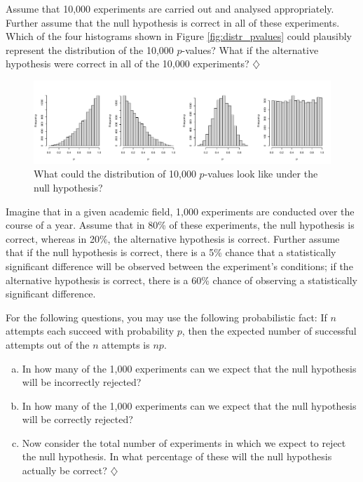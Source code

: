 \documentclass[a4paper]{tufte-book}\usepackage[]{graphicx}\usepackage[]{xcolor}
\newcommand*{\parend}[1][$\diamondsuit$]{%
\leavevmode\unskip\penalty9999 \hbox{}\nobreak\hfill
    \quad\hbox{#1}%
}
\begin{document}
Assume that 10,000 experiments are carried out and analysed appropriately.
Further assume that the null hypothesis is correct in all of these experiments.
Which of the four histograms shown in Figure \vref{fig:distr_pvalues}
could plausibly represent the distribution of the 10,000 $p$-values?
What if the alternative hypothesis were correct in all of the 10,000 experiments?
\parend

\begin{figure}[htp]
    \centering
    \includegraphics[width=\textwidth]{figure/distr_pvalues}
    \caption{What could the distribution of 10,000 $p$-values look like under the null hypothesis?}
    \label{fig:distr_pvalues}
\end{figure}

  Imagine that in a given academic field, 
  1,000 experiments are conducted over the course of a year.
  Assume that in 80\% of these experiments, the null hypothesis is correct,
  whereas in 20\%, the alternative hypothesis is correct.
  Further assume that if the null hypothesis is correct, 
  there is a 5\% chance that a statistically significant difference 
  will be observed between the experiment's conditions; 
  if the alternative hypothesis is correct, 
  there is a 60\% chance of observing a statistically significant difference.

  For the following questions, you may use the following probabilistic fact:
  If $n$ attempts each succeed with probability $p$,
  then the expected number of successful attempts out of the $n$ attempts is $np$.
  
  \begin{enumerate}[(a)]
    \item In how many of the 1,000 experiments can we expect that the
          null hypothesis will be incorrectly rejected?
    \item In how many of the 1,000 experiments can we expect that the
          null hypothesis will be correctly rejected?
    \item Now consider the total number of experiments in which we expect
          to reject the null hypothesis.
          In what percentage of these will the 
          null hypothesis actually be correct?\parend
  \end{enumerate}
        
\end{document}
